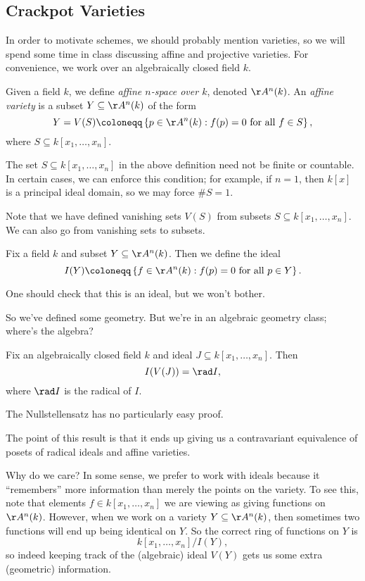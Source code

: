\documentclass[../notes.tex]{subfiles}
\begin{document}
\subsection{Crackpot Varieties}
In order to motivate schemes, we should probably mention varieties, so we will spend some time in class discussing affine and projective varieties. For convenience, we work over an algebraically closed field $k$.
\begin{definition}
	Given a field $k$, we define \textit{affine $n$-space over $k$}, denoted $\AA^n(k)$. An \textit{affine variety} is a subset $Y\subseteq\AA^n(k)$ of the form
	\[Y=V(S)\coloneqq\left\{p\in\AA^n(k):f(p)=0\text{ for all }f\in S\right\},\]
	where $S\subseteq k[x_1,\ldots,x_n]$.
\end{definition}
\begin{remark}
	The set $S\subseteq k[x_1,\ldots,x_n]$ in the above definition need not be finite or countable. In certain cases, we can enforce this condition; for example, if $n=1$, then $k[x]$ is a principal ideal domain, so we may force $\#S=1$.
\end{remark}
Note that we have defined vanishing sets $V(S)$ from subsets $S\subseteq k[x_1,\ldots,x_n]$. We can also go from vanishing sets to subsets.
\begin{definition} \label{defi:vansihingideal}
	Fix a field $k$ and subset $Y\subseteq\AA^n(k)$. Then we define the ideal
	\[I(Y)\coloneqq\left\{f\in\AA^n(k):f(p)=0\text{ for all }p\in Y\right\}.\]
\end{definition}
\begin{remark}
	One should check that this is an ideal, but we won't bother.
\end{remark}
So we've defined some geometry. But we're in an algebraic geometry class; where's the algebra?
\begin{theorem} \label{thm:nullstellensatz}
	Fix an algebraically closed field $k$ and ideal $J\subseteq k[x_1,\ldots,x_n]$.  Then
	\[I(V(J))=\rad I,\]
	where $\rad I$ is the radical of $I$.
\end{theorem}
\begin{remark}
	The Nullstellensatz has no particularly easy proof.
\end{remark}
The point of this result is that it ends up giving us a contravariant equivalence of posets of radical ideals and affine varieties.

Why do we care? In some sense, we prefer to work with ideals because it ``remembers'' more information than merely the points on the variety. To see this, note that elements $f\in k[x_1,\ldots,x_n]$ we are viewing as giving functions on $\AA^n(k)$. However, when we work on a variety $Y\subseteq\AA^n(k)$, then sometimes two functions will end up being identical on $Y$. So the correct ring of functions on $Y$ is
\[k[x_1,\ldots,x_n]/I(Y),\]
so indeed keeping track of the (algebraic) ideal $V(Y)$ gets us some extra (geometric) information.
\end{document}

